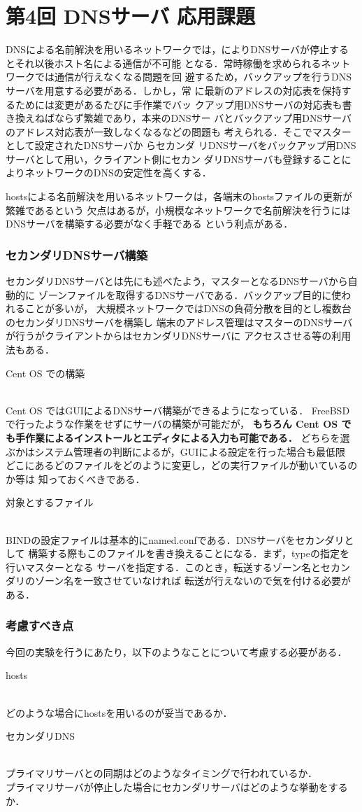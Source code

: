 \section{第4回 DNSサーバ 応用課題}
DNSによる名前解決を用いるネットワークでは，\textbf{}によりDNSサーバが停止するとそれ以後ホスト名による通信が不可能
となる．常時稼働を求められるネットワークでは通信が行えなくなる問題を回
避するため，バックアップを行うDNSサーバを用意する必要がある．しかし，常
に最新のアドレスの対応表を保持するためには変更があるたびに手作業でバッ
クアップ用DNSサーバの対応表も書き換えねばならず繁雑であり，本来のDNSサー
バとバックアップ用DNSサーバのアドレス対応表が一致しなくなるなどの問題も
考えられる．そこでマスターとして設定されたDNSサーバか
ら\textbf{}セカンダ
リDNSサーバをバックアップ用DNSサーバとして用い，クライアント側にセカン
ダリDNSサーバも登録することによりネットワークのDNSの安定性を高くする．

hostsによる名前解決を用いるネットワークは，各端末のhostsファイルの更新が繁雑であるという
欠点はあるが，小規模なネットワークで名前解決を行うにはDNSサーバを構築する必要がなく手軽である
という利点がある．

\subsubsection*{セカンダリDNSサーバ構築}
セカンダリDNSサーバとは先にも述べたよう，マスターとなるDNSサーバから自動的に
ゾーンファイルを取得するDNSサーバである．バックアップ目的に使われることが多いが，
大規模ネットワークではDNSの負荷分散を目的とし複数台のセカンダリDNSサーバを構築し
端末のアドレス管理はマスターのDNSサーバが行うがクライアントからはセカンダリDNSサーバに
アクセスさせる等の利用法もある．
\begin{itemize}
{\bf \item{Cent OS での構築}}\\
Cent OS ではGUIによるDNSサーバ構築ができるようになっている．
FreeBSD で行ったような作業をせずにサーバの構築が可能だが，
{\bf もちろん Cent OS でも手作業によるインストールとエディタによる入力も可能である．}
どちらを選ぶかはシステム管理者の判断によるが，GUIによる設定を行った場合も最低限
どこにあるどのファイルをどのように変更し，どの実行ファイルが動いているのか等は
知っておくべきである．
{\bf \item{対象とするファイル}}\\
BINDの設定ファイルは基本的にnamed.confである．DNSサーバをセカンダリとして
構築する際もこのファイルを書き換えることになる．まず，typeの指定を行いマスターとなる
サーバを指定する．このとき，転送するゾーン名とセカンダリのゾーン名を一致させていなければ
転送が行えないので気を付ける必要がある．
\end{itemize}

\subsubsection*{考慮すべき点}
今回の実験を行うにあたり，以下のようなことについて考慮する必要がある．
\begin{itemize}
{\bf \item{hosts}}\\
どのような場合にhostsを用いるのが妥当であるか．
{\bf \item{セカンダリDNS}}\\
プライマリサーバとの同期はどのようなタイミングで行われているか．\\
プライマリサーバが停止した場合にセカンダリサーバはどのような挙動をするか．
\end{itemize}
